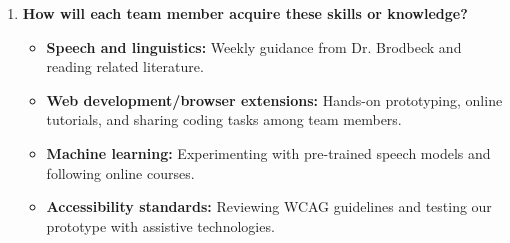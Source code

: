 \begin{enumerate}
  \item \textbf{How will each team member acquire these skills or knowledge?} \\
  \begin{itemize}
    \item \textbf{Speech and linguistics:} Weekly guidance from Dr. Brodbeck and reading related literature.
    \item \textbf{Web development/browser extensions:} Hands-on prototyping, online tutorials, and sharing coding tasks among team members.
    \item \textbf{Machine learning:} Experimenting with pre-trained speech models and following online courses.
    \item \textbf{Accessibility standards:} Reviewing WCAG guidelines and testing our prototype with assistive technologies.
  \end{itemize}
\end{enumerate}

